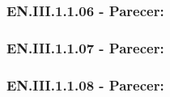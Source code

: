     \vspace{1cm} 
    
    \subsubsection*{EN.III.1.1.06 - Parecer:}

    \vspace{1cm} 
    
    \subsubsection*{EN.III.1.1.07 - Parecer:}
        
    \vspace{1cm} 
    
    \subsubsection*{EN.III.1.1.08 - Parecer:}
    
    \vspace{1cm} 
    \newpage


